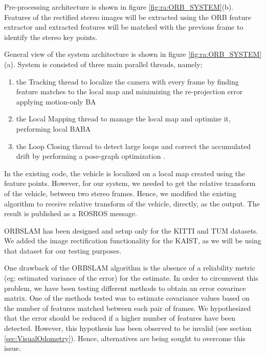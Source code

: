Pre-processing architecture is shown in figure \ref{fig:ra:ORB_SYSTEM}(b). Features of the rectified stereo images will be extracted using the ORB feature extractor \cite{ra:ORB} and extracted features will be matched with the previous frame to identify the stereo key points. 

General view of the system architecture is shown in figure \ref{fig:ra:ORB_SYSTEM}(a). System is consisted of three main parallel threads, namely;
\begin{enumerate}
	\item the Tracking thread to localize the camera with every frame by finding feature matches to the local map and minimizing the re-projection error applying motion-only \gls{BA}
	\item the Local Mapping thread to manage the local map and optimize it, performing local BA\gls{BA}
	\item the Loop Closing thread to detect large loops and correct the accumulated drift by performing a pose-graph optimization \cite{ra:ORB_SLAM2}.
\end{enumerate} 

In the existing code, the vehicle is localized on a local map created using the feature points. However, for our system, we needed to get the relative transform of the vehicle, between two stereo frames. Hence, we modified the existing algorithm to receive relative transform of the vehicle, directly, as the output. The result is published as a ROS\gls{ROS} message.

\gls{ORBSLAM} has been designed and setup only for the \gls{KITTI} and \gls{TUM} datasets. We added the image rectification functionality for the \gls{KAIST}, as we will be using that dataset for our testing purposes.

One drawback of the \gls{ORBSLAM} algorithm is the absence of a reliability metric (eg: estimated variance of the error) for the estimate. In order to circumvent this problem, we have been testing different methods to obtain an error covarince matrix. One of the methods tested was to estimate covariance values based on the number of features matched between each pair of frames. We hypothesized that the error should be reduced if a higher number of features have been detected. However, this hypothesis has been observed to be invalid (see section \ref{sec:VisualOdometry}). Hence, alternatives are being sought to overcome this issue. 












